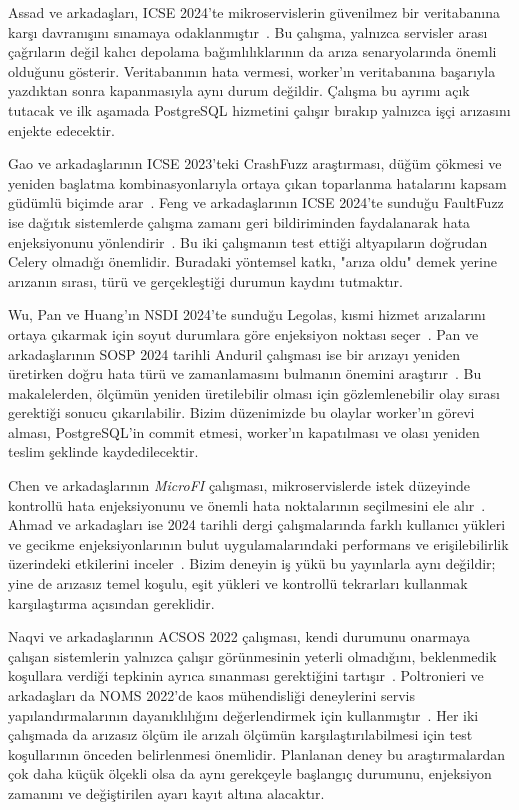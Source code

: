 \documentclass[conference,a4paper]{IEEEtran}
\newcommand{\eng}[1]{\textit{#1}}
\begin{document}
Assad ve arkadaşları, ICSE 2024'te mikroservislerin güvenilmez bir veritabanına karşı davranışını sınamaya odaklanmıştır~\cite{assad2024}. Bu çalışma, yalnızca servisler arası çağrıların değil kalıcı depolama bağımlılıklarının da arıza senaryolarında önemli olduğunu gösterir. Veritabanının hata vermesi, worker'ın veritabanına başarıyla yazdıktan sonra kapanmasıyla aynı durum değildir. Çalışma bu ayrımı açık tutacak ve ilk aşamada PostgreSQL hizmetini çalışır bırakıp yalnızca işçi arızasını enjekte edecektir.

Gao ve arkadaşlarının ICSE 2023'teki CrashFuzz araştırması, düğüm çökmesi ve yeniden başlatma kombinasyonlarıyla ortaya çıkan toparlanma hatalarını kapsam güdümlü biçimde arar~\cite{gao2023}. Feng ve arkadaşlarının ICSE 2024'te sunduğu FaultFuzz ise dağıtık sistemlerde çalışma zamanı geri bildiriminden faydalanarak hata enjeksiyonunu yönlendirir~\cite{feng2024}. Bu iki çalışmanın test ettiği altyapıların doğrudan Celery olmadığı önemlidir. Buradaki yöntemsel katkı, "arıza oldu" demek yerine arızanın sırası, türü ve gerçekleştiği durumun kaydını tutmaktır.

Wu, Pan ve Huang'ın NSDI 2024'te sunduğu Legolas, kısmi hizmet arızalarını ortaya çıkarmak için soyut durumlara göre enjeksiyon noktası seçer~\cite{wu2024}. Pan ve arkadaşlarının SOSP 2024 tarihli Anduril çalışması ise bir arızayı yeniden üretirken doğru hata türü ve zamanlamasını bulmanın önemini araştırır~\cite{pan2024}. Bu makalelerden, ölçümün yeniden üretilebilir olması için gözlemlenebilir olay sırası gerektiği sonucu çıkarılabilir. Bizim düzenimizde bu olaylar worker'ın görevi alması, PostgreSQL'in commit etmesi, worker'ın kapatılması ve olası yeniden teslim şeklinde kaydedilecektir.

Chen ve arkadaşlarının \eng{MicroFI} çalışması, mikroservislerde istek düzeyinde kontrollü hata enjeksiyonunu ve önemli hata noktalarının seçilmesini ele alır~\cite{chen2024}. Ahmad ve arkadaşları ise 2024 tarihli dergi çalışmalarında farklı kullanıcı yükleri ve gecikme enjeksiyonlarının bulut uygulamalarındaki performans ve erişilebilirlik üzerindeki etkilerini inceler~\cite{ahmad2024}. Bizim deneyin iş yükü bu yayınlarla aynı değildir; yine de arızasız temel koşulu, eşit yükleri ve kontrollü tekrarları kullanmak karşılaştırma açısından gereklidir.

Naqvi ve arkadaşlarının ACSOS 2022 çalışması, kendi durumunu onarmaya çalışan sistemlerin yalnızca çalışır görünmesinin yeterli olmadığını, beklenmedik koşullara verdiği tepkinin ayrıca sınanması gerektiğini tartışır~\cite{naqvi2022}. Poltronieri ve arkadaşları da NOMS 2022'de kaos mühendisliği deneylerini servis yapılandırmalarının dayanıklılığını değerlendirmek için kullanmıştır~\cite{poltronieri2022}. Her iki çalışmada da arızasız ölçüm ile arızalı ölçümün karşılaştırılabilmesi için test koşullarının önceden belirlenmesi önemlidir. Planlanan deney bu araştırmalardan çok daha küçük ölçekli olsa da aynı gerekçeyle başlangıç durumunu, enjeksiyon zamanını ve değiştirilen ayarı kayıt altına alacaktır.
\end{document}
